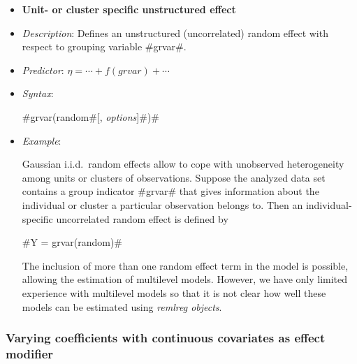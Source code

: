 \begin{itemize}
\item[]{\bf\sffamily Unit- or cluster specific unstructured
effect}

\item[] {\em Description}: Defines an unstructured (uncorrelated)
random effect with respect to grouping variable #grvar#. \item[]
{\em Predictor}: $\eta = \cdots + f(grvar) + \cdots$ \item[] {\em
Syntax}:

#grvar(random#[, {\em options}]#)#
\item[] {\em Example}:

Gaussian i.i.d.~random effects allow to cope with unobserved
heterogeneity among units or clusters of observations. Suppose the
analyzed data set contains a group indicator #grvar# that gives
information about the individual or cluster a particular
observation belongs to. Then an individual-specific uncorrelated
random effect is defined by

#Y = grvar(random)#

The inclusion of more than one random effect term in the model is
possible, allowing the estimation of multilevel models. However,
we have only limited experience with multilevel models so that it
is not clear how well these models can be estimated using {\em
remlreg objects}.
\end{itemize}

\subsubsection*{Varying coefficients with continuous covariates as
effect modifier}

